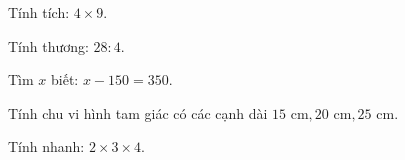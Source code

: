 \begin{ex} %
Tính tích: $4 \times 9$.
\end{ex}

\begin{ex} %
Tính thương: $28 : 4$.
\end{ex}

\begin{ex} %
Tìm $x$ biết: $x - 150 = 350$.
\end{ex}

\begin{ex} %
Tính chu vi hình tam giác có các cạnh dài $15\text{ cm}, 20\text{ cm}, 25\text{ cm}$.
\end{ex}

\begin{ex} %
Tính nhanh: $2 \times 3 \times 4$.
\end{ex}

